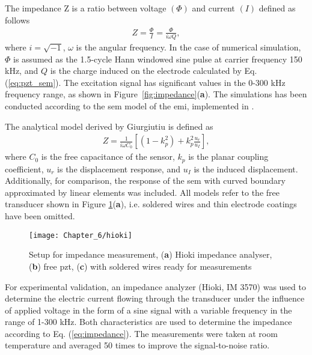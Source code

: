 \documentclass[11pt,a4paper,final]{report}
\theoremstyle{plain}
\begin{document}
The impedance Z is a ratio between voltage \((\Phi)\) and current \((I)\) defined as follows
\begin{eqnarray}
	Z = \frac{\Phi}{I} = \frac{\Phi}{i\omega Q},
	\label{eq:impedance}
\end{eqnarray}
where \(i=\sqrt{-1}\), \(\omega\) is the angular frequency.
In the case of numerical simulation, \(\Phi\) is assumed as the 1.5-cycle Hann windowed sine pulse at carrier frequency 150 \unit{\kHz}, and \(Q\) is the charge induced on the electrode calculated by Eq. (\ref{eq:pzt_sem}).
The excitation signal has significant values in the 0-300 \unit{\kHz} frequency range, as shown in Figure~\ref{fig:impedance}(\textbf{a}).
The simulations has been conducted according to the \ac{sem} model of the \ac{emi}, implemented in \cite{fiborek2018time}.

The analytical model derived by Giurgiutiu \cite{giurgiutiu2009micromechatronics} is defined as
\begin{eqnarray}
	Z = \frac{1}{i\omega C_0}\left[\left(1-k_p^2\right)+k_p^2\frac{u_r}{u_I}\right],
\end{eqnarray}
where \(C_0\) is the free capacitance of the sensor, \(k_p\) is the planar coupling coefficient, \(u_r\) is the displacement response, and \(u_I\) is the induced displacement.
Additionally, for comparison, the response of the \ac{sem} with curved boundary approximated by linear elements was included.
All models refer to the free transducer shown in Figure \ref{fig:hioki}(\textbf{a}), i.e. soldered wires and thin electrode coatings have been omitted.

\begin{figure}[H]
	\begin{center}
		\texttt{[image: Chapter\_6/hioki]}
	\end{center}
	\caption{Setup for impedance measurement, (\textbf{a}) Hioki impedance analyser, (\textbf{b}) free \acl{pzt}, (\textbf{c}) with soldered wires ready for measurements}
	\label{fig:hioki}
\end{figure}
For experimental validation, an impedance analyzer (Hioki, IM 3570) was used to determine the electric current flowing through the transducer under the influence of applied voltage in the form of a sine signal with a variable frequency in the range of 1-300 \unit{\kHz}.
Both characteristics are used to determine the impedance according to Eq. (\ref{eq:impedance}).
The measurements were taken at room temperature and averaged 50 times to improve the signal-to-noise ratio.
\end{document}
